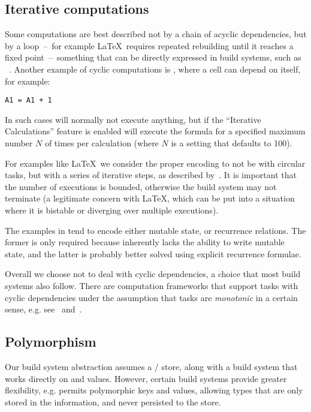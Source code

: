 \subsection{Iterative computations}\label{sec-iterative-compute}

Some computations are best described not by a chain of acyclic dependencies,
but by a loop~--~for example \LaTeX~requires repeated rebuilding until it
reaches a fixed point~--~something that can be directly expressed in build
systems, such as \Pluto~\cite{erdweg2015pluto}. Another example of cyclic
computations is \Excel, where a cell can depend on itself, for example:

\begin{verbatim}
A1 = A1 + 1
\end{verbatim}

In such cases \Excel will normally not execute anything, but if the
``Iterative Calculations'' feature is enabled will execute the formula for a
specified maximum number $N$ of times per calculation (where $N$ is a
setting that defaults to 100).

For examples like \LaTeX~we consider the proper encoding to not be with circular
tasks, but with a series of iterative steps, as described
by~\citet{shake-fixed-point}. It is important that the number of executions is
bounded, otherwise the build system may not terminate (a legitimate concern
with \LaTeX, which can be put into a situation where it is bistable or diverging
over multiple executions).

The examples in \Excel tend to encode either mutable state, or recurrence
relations. The former is only required because \Excel inherently lacks the
ability to write mutable state, and the latter is probably better solved using
explicit recurrence formulae.

Overall we choose not to deal with cyclic dependencies, a choice that most build
systems also follow. There are computation frameworks that support tasks with
cyclic dependencies under the assumption that tasks are \emph{monotonic} in a
certain sense, e.g. see~\cite{pottier2009lazy} and~\cite{radul2009propagation}.

\subsection{Polymorphism}\label{sec-polymorphism}

Our build system abstraction assumes a / store, along with a build
system that works directly on  and  values. However, certain build
systems provide greater flexibility, e.g. \Shake permits polymorphic keys and
values, allowing types that are only stored in the \Shake information, and never
persisted to the store.

